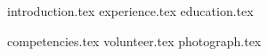 \documentclass[letterpaper,11pt]{article}
\begin{document}


{introduction.tex}
{experience.tex}
{education.tex}

\pagebreak

{competencies.tex}
{volunteer.tex}
{photograph.tex}


\pagebreak
\end{document}
